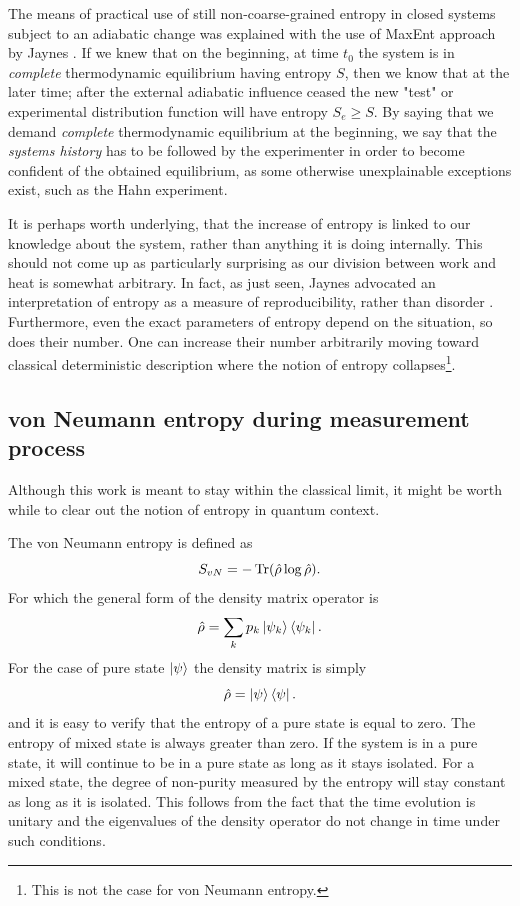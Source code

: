 \documentclass[a4paper,12pt]{article}
\begin{document}
The means of practical use of still non-coarse-grained entropy in closed systems subject to an adiabatic change was explained with the use of MaxEnt approach by Jaynes \cite{Jaynes:1965gg}. If we knew that on the beginning, at time $t_0$ the system is in \textit{complete} thermodynamic equilibrium having entropy $S$, then we know that at the later time; after the external adiabatic influence ceased the new "test" or experimental distribution function will have entropy $S_e \geq S$. By saying that we demand \textit{complete} thermodynamic equilibrium at the beginning, we say that the \textit{systems history} has to be followed by the experimenter in order to become confident of the obtained equilibrium, as some otherwise unexplainable exceptions exist, such as the Hahn experiment. %

It is perhaps worth underlying, that the increase of entropy is linked to our knowledge about the system, rather than anything it is doing internally. This should not come up as particularly surprising as our division between work and heat is somewhat arbitrary. In fact, as just seen, Jaynes advocated an interpretation of entropy as a measure of reproducibility, rather than disorder \cite{Jaynes:1957zz}.
Furthermore, even the exact parameters of entropy depend on the situation, so does their number. One can increase their number arbitrarily moving toward classical deterministic description where the notion of entropy collapses\footnote{This is not the case for von Neumann entropy.}.

\subsection{von Neumann entropy during measurement process}

Although this work is meant to stay within the classical limit, it might be worth while to clear out the notion of entropy in quantum context.

The von Neumann entropy is defined as 
\begin{equation}
  S_{vN}= -\Tr(\hat{\rho} \log{\hat{\rho}}).
\end{equation}
For which the general form of the density matrix operator is
\begin{equation}
	\hat{\rho}=\sum_k p_k \ket{\psi_k}\bra{\psi_k} .
\end{equation}
For the case of pure state $\ket{\psi}$ the density matrix is simply
\begin{equation}
  \hat{\rho} = \ket{\psi}\bra{\psi}.
\end{equation}
and it is easy to verify that the entropy of a pure state is equal to zero. The entropy of mixed state is always greater than zero.
If the system is in a pure state, it will continue to be in a pure state as long as it stays isolated. For a mixed state, the degree of non-purity measured by the entropy will stay constant as long as it is isolated. This follows from the fact that the time evolution is unitary and the eigenvalues of the density operator do not change in time under such conditions.
\end{document}
